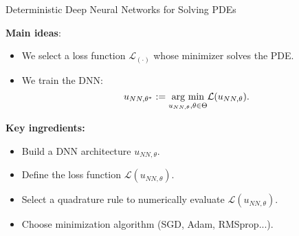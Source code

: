 \begin{frame}{Deterministic Deep Neural Networks for Solving PDEs}

\textbf{Main ideas}:
\begin{itemize}

\item We select a loss function $\mathcal{L}_{(\cdot)}$ whose minimizer solves the PDE.

\item We train the DNN:
\begin{equation*}
u_{NN,\theta^*} := \underset{u_{NN,\theta}, \theta \in \Theta}{\textup{ arg min }} \mathcal{L}(u_{NN,\theta}).
\end{equation*}

\end{itemize}


\textbf{Key ingredients:}
\begin{itemize}
\item Build a DNN architecture $u_{NN,\theta}$.
\item Define the loss function  $\mathcal{L}(u_{NN,\theta})$.
\item Select a quadrature rule to numerically evaluate $\mathcal{L}(u_{NN,\theta})$.
\item Choose minimization algorithm (SGD, Adam, RMSprop...).
\end{itemize}
\end{frame}

